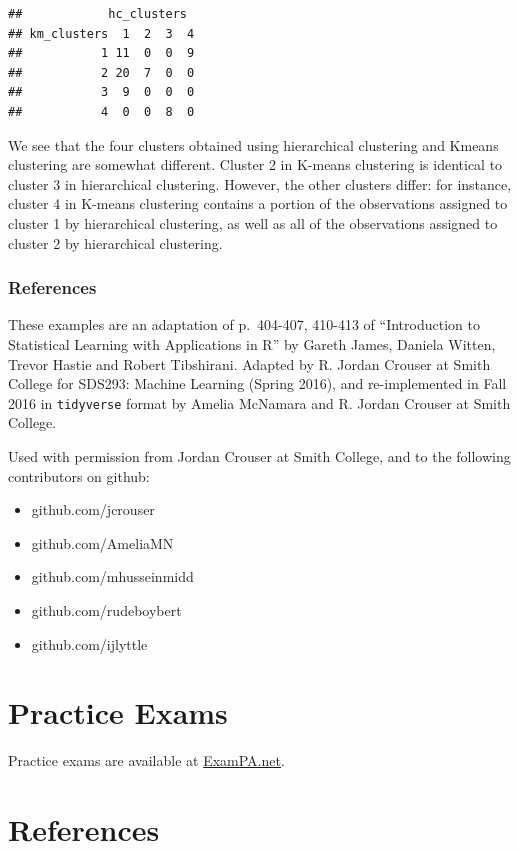 \documentclass[openany]{book}
\providecommand{\tightlist}{%
  \setlength{\itemsep}{0pt}\setlength{\parskip}{0pt}}
\begin{document}
\begin{verbatim}
##            hc_clusters
## km_clusters  1  2  3  4
##           1 11  0  0  9
##           2 20  7  0  0
##           3  9  0  0  0
##           4  0  0  8  0
\end{verbatim}

We see that the four clusters obtained using hierarchical clustering and Kmeans
clustering are somewhat different. Cluster 2 in K-means clustering is
identical to cluster 3 in hierarchical clustering. However, the other clusters
differ: for instance, cluster 4 in K-means clustering contains a portion of
the observations assigned to cluster 1 by hierarchical clustering, as well as
all of the observations assigned to cluster 2 by hierarchical clustering.

\hypertarget{references-1}{%
\subsection{References}\label{references-1}}

These examples are an adaptation of p.~404-407, 410-413 of ``Introduction to
Statistical Learning with Applications in R'' by Gareth James, Daniela Witten, Trevor Hastie and Robert
Tibshirani. Adapted by R. Jordan Crouser at Smith College for SDS293: Machine Learning (Spring 2016), and re-implemented in Fall 2016 in \texttt{tidyverse} format by Amelia McNamara and R. Jordan Crouser at Smith College.

Used with permission from Jordan Crouser at Smith College, and to the following contributors on github:

\begin{itemize}
\tightlist
\item
  github.com/jcrouser
\item
  github.com/AmeliaMN
\item
  github.com/mhusseinmidd
\item
  github.com/rudeboybert
\item
  github.com/ijlyttle
\end{itemize}

\hypertarget{practice-exams}{%
\chapter{Practice Exams}\label{practice-exams}}

Practice exams are available at \href{https://exampa.net/pricing}{ExamPA.net}.

\hypertarget{references-2}{%
\chapter{References}\label{references-2}}
\end{document}
